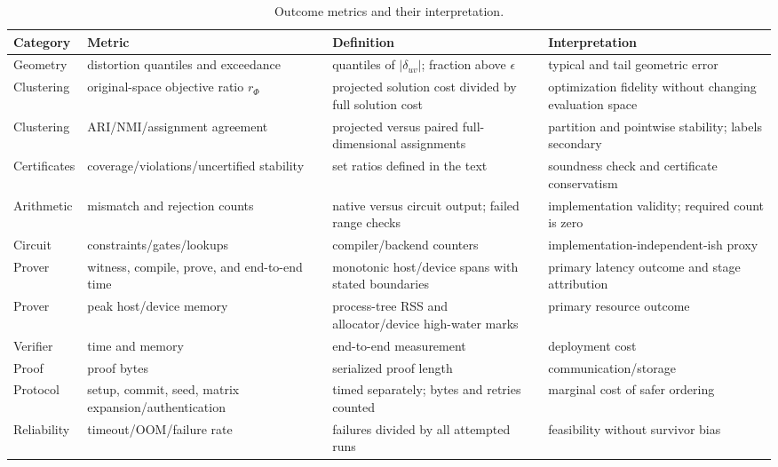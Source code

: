\documentclass[pdflatex,sn-mathphys-num,iicol]{sn-jnl}
\theoremstyle{plain}
\theoremstyle{definition}
\theoremstyle{remark}
\begin{document}
\begin{table}[!htbp]
\caption{Outcome metrics and their interpretation.}\label{tab:metrics-a}
\centering\scriptsize
\begin{adjustbox}{max width=\textwidth}
\begin{tabularx}{\textwidth}{@{}Y Y Y Y@{}}
\toprule
Category & Metric & Definition & Interpretation \\
\midrule
Geometry & distortion quantiles and exceedance & quantiles of $|\delta_{uv}|$; fraction above $\epsilon$ & typical and tail geometric error \\
Clustering & original-space objective ratio $r_\Phi$ & projected solution cost divided by full solution cost & optimization fidelity without changing evaluation space \\
Clustering & ARI/NMI/assignment agreement & projected versus paired full-dimensional assignments & partition and pointwise stability; labels secondary \\
Certificates & coverage/violations/uncertified stability & set ratios defined in the text & soundness check and certificate conservatism \\
Arithmetic & mismatch and rejection counts & native versus circuit output; failed range checks & implementation validity; required count is zero \\
Circuit & constraints/gates/lookups & compiler/backend counters & implementation-independent-ish proxy \\
Prover & witness, compile, prove, and end-to-end time & monotonic host/device spans with stated boundaries & primary latency outcome and stage attribution \\
Prover & peak host/device memory & process-tree RSS and allocator/device high-water marks & primary resource outcome \\
Verifier & time and memory & end-to-end measurement & deployment cost \\
Proof & proof bytes & serialized proof length & communication/storage \\
Protocol & setup, commit, seed, matrix expansion/authentication & timed separately; bytes and retries counted & marginal cost of safer ordering \\
Reliability & timeout/OOM/failure rate & failures divided by all attempted runs & feasibility without survivor bias \\
\bottomrule
\end{tabularx}
\end{adjustbox}
\end{table}
\end{document}
